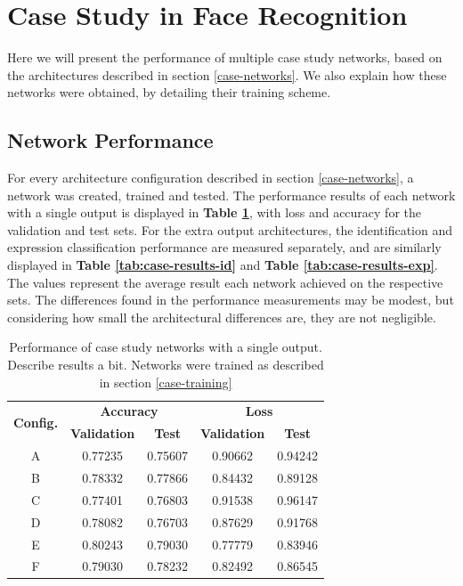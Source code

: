 \section{Case Study in Face Recognition} \label{sec:case-results}

Here we will present the performance of multiple case study networks, based on the architectures described in section \ref{case-networks}. We also explain how these networks were obtained, by detailing their training scheme. 

\subsection{Network Performance}

For every architecture configuration described in section \ref{case-networks}, a network was created, trained and tested. The performance results of each network with a single output is displayed in \textbf{Table \ref{tab:case-results}}, with loss and accuracy for the validation and test sets. For the extra output architectures, the identification and expression classification performance are measured separately, and are similarly displayed in \textbf{Table \ref{tab:case-results-id}} and \textbf{Table \ref{tab:case-results-exp}}. The values represent the average result each network achieved on the respective sets. The differences found in the performance measurements may be modest, but considering how small the architectural differences are, they are not negligible.



\begin{table}[h!]
\begin{center}
\begin{tabular}{|c|c|c|c|c|}
\hline
\multirow{2}{*}{\textbf{Config.}} & \multicolumn{2}{|c|}{\textbf{Accuracy}} & \multicolumn{2}{|c|}{\textbf{Loss}} \\ \cline{2-5}
 & \textbf{Validation} & \textbf{Test} & \textbf{Validation} & \textbf{Test} \\ \hline
A & 0.77235 & 0.75607 & 0.90662 & 0.94242 \\ \hline
B & 0.78332 & 0.77866 & 0.84432 & 0.89128 \\ \hline
C & 0.77401 & 0.76803 & 0.91538 & 0.96147 \\ \hline
D & 0.78082 & 0.76703 & 0.87629 & 0.91768 \\ \hline
E & 0.80243 & 0.79030 & 0.77779 & 0.83946 \\ \hline
F & 0.79030 & 0.78232 & 0.82492 & 0.86545 \\ \hline
\end{tabular}
\end{center}
\caption[Performance of case study networks with a single output]{Performance of case study networks with a single output. Describe results a bit. Networks were trained as described in section \ref{case-training}}
\label{tab:case-results}
\end{table}



